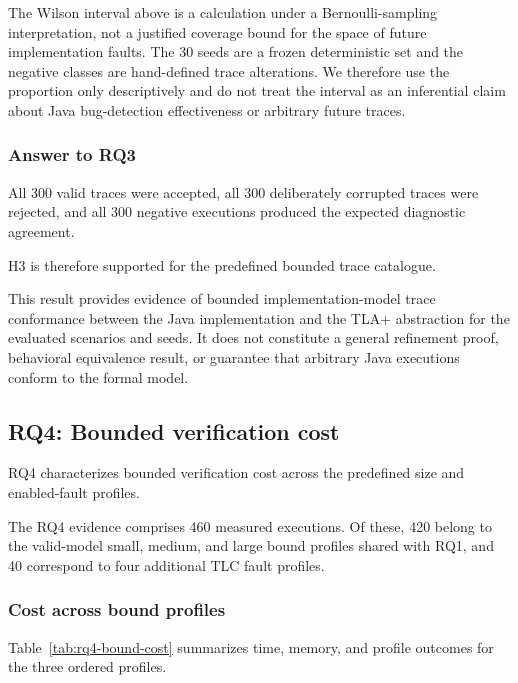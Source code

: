 The Wilson interval above is a calculation under a Bernoulli-sampling
interpretation, not a justified coverage bound for the space of future
implementation faults. The 30 seeds are a frozen deterministic set and the
negative classes are hand-defined trace alterations. We therefore use the
proportion only descriptively and do not treat the interval as an inferential
claim about Java bug-detection effectiveness or arbitrary future traces.

\subsubsection{Answer to RQ3}
\label{subsubsec:rq3-answer}

All 300 valid traces were accepted, all 300 deliberately corrupted
traces were rejected, and all 300 negative executions produced the
expected diagnostic agreement.

H3 is therefore supported for the predefined bounded trace catalogue.

This result provides evidence of bounded implementation-model trace
conformance between the Java implementation and the TLA+ abstraction
for the evaluated scenarios and seeds. It does not constitute a
general refinement proof, behavioral equivalence result, or guarantee
that arbitrary Java executions conform to the formal model.

\subsection{RQ4: Bounded verification cost}
\label{subsec:rq4-results}

RQ4 characterizes bounded verification cost across the predefined size
and enabled-fault profiles.

The RQ4 evidence comprises 460 measured executions. Of these, 420
belong to the valid-model small, medium, and large bound profiles
shared with RQ1, and 40 correspond to four additional TLC fault
profiles.

\subsubsection{Cost across bound profiles}
\label{subsubsec:rq4-bound-cost}

Table~\ref{tab:rq4-bound-cost} summarizes time, memory, and profile
outcomes for the three ordered profiles.

